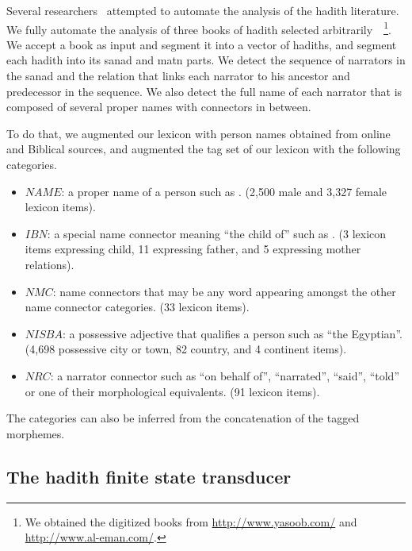 \documentclass{llncs}
\begin{document}
Several researchers~\cite{iTree,Hadithopaedia:08} attempted to automate 
the analysis of the hadith literature. 
We fully automate the analysis of three books of hadith selected 
arbitrarily~\cite{IbnHanbal,AlKulayni,AlTousi}~\footnote{We obtained
  the digitized books from 
  \href{http://www.yasoob.com/}{http://www.yasoob.com/} and 
  \href{http://www.al-eman.com/}{http://www.al-eman.com/}. }.
We accept a book as input
and segment it into a vector of hadiths,
and segment each hadith into its sanad and matn parts. 
We detect the sequence of narrators in the sanad and 
the relation that links each narrator to his ancestor and 
predecessor in the sequence. 
We also detect the full name of each narrator that is
composed of several proper names with connectors
in between. 


To do that, we augmented our lexicon with person names obtained from online and Biblical sources,
and augmented the tag set of our lexicon with the following categories.
\begin{itemize}
\item $\mathit{NAME}$: a proper name of a person such as . (2,500 male and 3,327 female lexicon items). 
\item $\mathit{IBN}$: a special name connector meaning ``the child of'' such as . (3 lexicon items expressing child,
11 expressing father, and 5 expressing mother relations).
\item $\mathit{NMC}$: name connectors that may be any word appearing amongst the other name connector categories. (33 lexicon items).
\item $\mathit{NISBA}$: a possessive adjective that qualifies a person such as  ``the Egyptian''. (4,698 possessive city or town, 82 country, and 4 continent items). 
\item $\mathit{NRC}$: a narrator connector such as
 ``on behalf of'',  ``narrated'',  ``said'',  ``told'' or one of their morphological equivalents. (91 lexicon items).
\end{itemize}
The categories can also be inferred from the concatenation of the tagged morphemes.

\subsection{The hadith finite state transducer}
\label{sec:FST}
\end{document}
